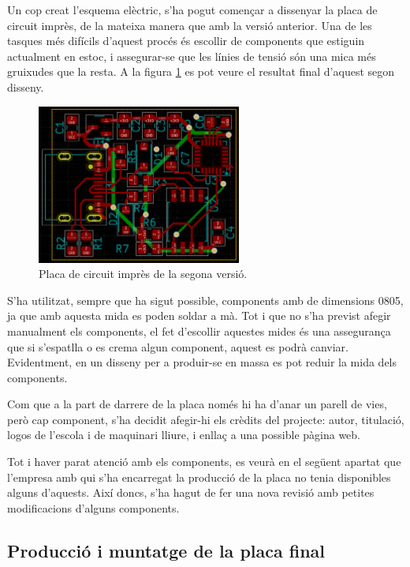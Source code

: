 Un cop creat l'esquema elèctric, s'ha pogut començar a dissenyar la placa de
circuit imprès, de la mateixa manera que amb la versió anterior. Una de les
tasques més difícils d'aquest procés és escollir  de components
que estiguin actualment en estoc, i assegurar-se que les línies de tensió
són una mica més gruixudes que la resta. A la figura \ref{fig:pcb_v2}
es pot veure el resultat
final d'aquest segon disseny.

\begin{figure}[ht]
    \centering
    \includegraphics[width=0.6\textwidth]{images/kicad/gyro2_pcb.png}
    \caption{Placa de circuit imprès de la segona versió.}
    \label{fig:pcb_v2}
\end{figure}

S'ha utilitzat,
sempre que ha sigut possible, components amb  de dimensions 0805,
ja que amb aquesta mida es poden soldar a mà. Tot i que no s'ha previst afegir
manualment els components, el fet d'escollir aquestes mides és una assegurança
que si s'espatlla o es crema algun component, aquest es podrà canviar.
Evidentment, en un disseny per a produir-se en massa es pot reduir la mida dels
components.

Com que a la part de darrere de la placa només hi ha d'anar un parell de vies,
però cap component, s'ha decidit afegir-hi els crèdits del projecte: autor,
titulació, logos de l'escola i de maquinari lliure, i enllaç a una possible
pàgina web.

Tot i haver parat atenció amb els components, es veurà en el següent apartat que
l'empresa amb qui s'ha encarregat la producció de la placa no tenia disponibles
alguns d'aquests. Així doncs, s'ha hagut de fer una nova revisió amb petites
modificacions d'alguns components.

\subsection{Producció i muntatge de la placa final}

